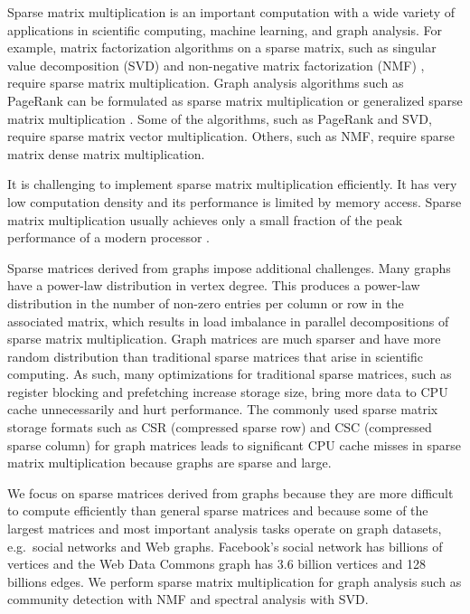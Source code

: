 Sparse matrix multiplication is an important computation with a wide variety
of applications in scientific computing, machine learning, and graph analysis.
For example, matrix factorization algorithms on a sparse matrix, such as
singular value decomposition (SVD) \cite{svd} and non-negative matrix
factorization (NMF) \cite{nmf}, require sparse matrix multiplication.
Graph analysis algorithms such as PageRank \cite{pagerank} can be
formulated as sparse matrix multiplication or generalized sparse matrix
multiplication \cite{Mattson13}. Some of
the algorithms, such as PageRank and SVD, require sparse matrix vector
multiplication. Others, such as NMF, require sparse matrix dense
matrix multiplication.

It is challenging to implement sparse matrix multiplication efficiently. 
It has very low computation density and its
performance is limited by memory access. Sparse matrix multiplication usually achieves only
a small fraction of the peak performance of a modern processor \cite{Williams07}.

Sparse matrices derived from graphs impose additional challenges.
Many graphs have a power-law distribution in vertex
degree.  This produces a power-law distribution in the number of non-zero 
entries per column or row in the associated matrix, which   
results in load imbalance in parallel decompositions of sparse 
matrix multiplication. 
Graph matrices are much sparser and have more random distribution 
than traditional sparse matrices that arise in scientific
computing. As such, many optimizations for traditional sparse matrices, such
as register blocking and prefetching \cite{Williams07} increase storage size,
bring more data to CPU cache unnecessarily and hurt performance.
The commonly used sparse matrix storage formats such as CSR (compressed sparse
row) and CSC (compressed sparse column) for graph matrices leads to significant
CPU cache misses in sparse matrix multiplication because graphs are sparse and
large.

We focus on sparse matrices derived from graphs because they are more difficult 
to compute efficiently than general sparse matrices and because some of the 
largest matrices and most important analysis tasks operate on graph datasets, 
e.g.~social networks and Web graphs. 
Facebook's social network has billions of vertices and
the Web Data Commons graph \cite{web_graph} has 3.6 billion vertices and 128
billions edges. We perform sparse matrix multiplication for graph
analysis such as community detection with NMF and spectral analysis with SVD.

